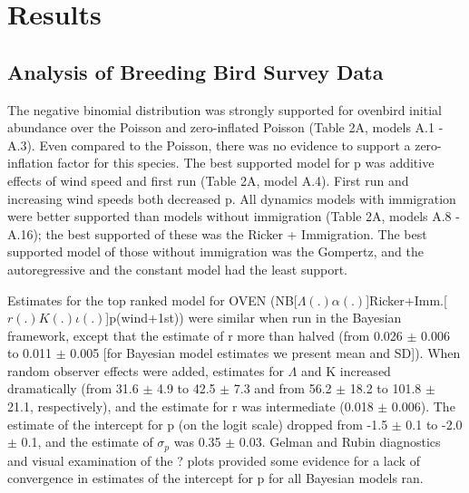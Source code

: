 \documentclass[12pt]{article}
\begin{document}
\section{Results}

\subsection{Analysis of Breeding Bird Survey Data}


The negative binomial distribution was strongly supported for ovenbird
initial abundance over the Poisson and zero-inflated Poisson (Table
2A, models A.1 - A.3).  Even compared to the Poisson, there was no
evidence to support a zero-inflation factor for this species.  The
best supported model for p was additive effects of wind speed and
first run (Table 2A, model A.4).  First run and increasing wind speeds
both decreased p.  All dynamics models with immigration were better
supported than models without immigration (Table 2A, models A.8 -
A.16); the best supported of these was the Ricker + Immigration.  The
best supported model of those without immigration was the Gompertz,
and the autoregressive and the constant model had the least support.

Estimates for the top ranked model for OVEN
(NB[$\Lambda (.) \alpha (.)$]Ricker+Imm.[$r(.)K(.) \iota (.)$]p(wind+1st)) were similar when
run in the Bayesian framework, except that the estimate of r more than
halved (from 0.026 $\pm$ 0.006 to 0.011 $\pm$ 0.005 [for Bayesian model
estimates we present mean and SD]).  When random observer effects were
added, estimates for $\Lambda$ and K increased dramatically (from 31.6 $\pm$ 4.9
to 42.5 $\pm$ 7.3 and from 56.2 $\pm$ 18.2 to 101.8 $\pm$ 21.1, respectively), and
the estimate for r was intermediate (0.018 $\pm$ 0.006).  The estimate of
the intercept for p (on the logit scale) dropped from -1.5 $\pm$ 0.1 to
-2.0 $\pm$ 0.1, and the estimate of $\sigma_p$ was 0.35 $\pm$ 0.03.  
Gelman and Rubin diagnostics and visual examination of the ? plots
provided some evidence for a lack of convergence in estimates of the
intercept for p for all Bayesian models ran.
\end{document}
